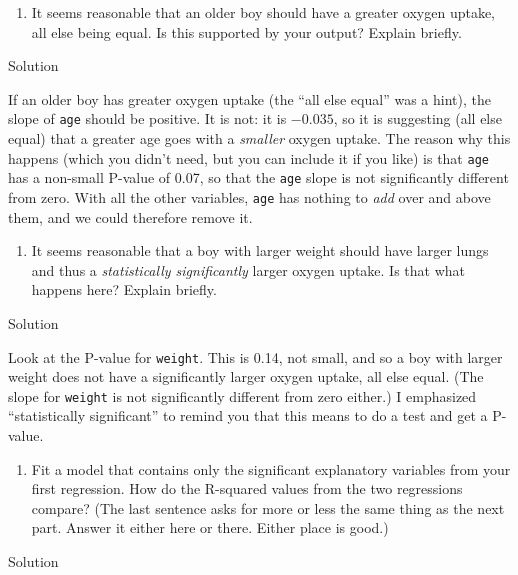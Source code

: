 \documentclass[]{tufte-book}
\providecommand{\tightlist}{%
  \setlength{\itemsep}{0pt}\setlength{\parskip}{0pt}}
\theoremstyle{definition}
\theoremstyle{definition}
\theoremstyle{definition}
\theoremstyle{remark}
\begin{document}
\begin{enumerate}
\def\labelenumi{(\alph{enumi})}
\setcounter{enumi}{3}
\tightlist
\item
  It seems reasonable that an older boy should have a greater oxygen
  uptake, all else being equal. Is this supported by your output?
  Explain briefly.
\end{enumerate}

Solution

If an older boy has greater oxygen uptake (the ``all else equal'' was a
hint), the slope of \texttt{age} should be positive. It is not: it is
\(-0.035\), so it is suggesting (all else equal) that a greater age goes
with a \emph{smaller} oxygen uptake. The reason why this happens (which
you didn't need, but you can include it if you like) is that
\texttt{age} has a non-small P-value of 0.07, so that the \texttt{age}
slope is not significantly different from zero. With all the other
variables, \texttt{age} has nothing to \emph{add} over and above them,
and we could therefore remove it.

\begin{enumerate}
\def\labelenumi{(\alph{enumi})}
\setcounter{enumi}{4}
\tightlist
\item
  It seems reasonable that a boy with larger weight should have larger
  lungs and thus a \emph{statistically
  significantly} larger oxygen uptake. Is that what happens here?
  Explain briefly.
\end{enumerate}

Solution

Look at the P-value for \texttt{weight}. This is 0.14, not small, and so
a boy with larger weight does not have a significantly larger oxygen
uptake, all else equal. (The slope for \texttt{weight} is not
significantly different from zero either.) I emphasized ``statistically
significant'' to remind you that this means to do a test and get a
P-value.

\begin{enumerate}
\def\labelenumi{(\alph{enumi})}
\setcounter{enumi}{5}
\tightlist
\item
  Fit a model that contains only the significant explanatory variables
  from your first regression. How do the R-squared values from the two
  regressions compare? (The last sentence asks for more or less the same
  thing as the next part. Answer it either here or there. Either place
  is good.)
\end{enumerate}

Solution
\end{document}
